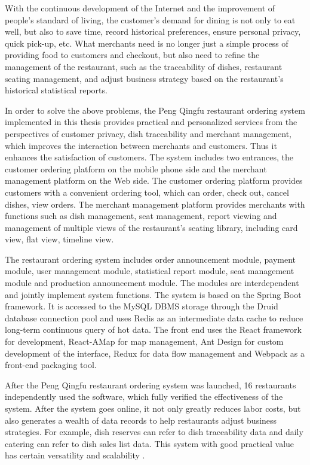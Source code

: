 \documentclass[oneside, master, UTF8]{NJUthesis}
\theoremstyle{plain}
\begin{document}
\begin{englishabstract}

With the continuous development of the Internet and the improvement of people's standard of living, the customer's demand for dining is not only to eat well, but also to save time, record historical preferences, ensure personal privacy, quick pick-up, etc.
What merchants need is no longer just a simple process of providing food to customers and checkout, but also need to refine the management of the restaurant, such as the traceability of dishes, restaurant seating management, and adjust business strategy based on the restaurant's historical statistical reports.

In order to solve the above problems, the Peng Qingfu restaurant ordering system implemented in this thesis provides practical and personalized services from the perspectives of customer privacy, dish traceability and merchant management, which improves the interaction between merchants and customers. Thus it enhances the satisfaction of customers. The system includes two entrances, the customer ordering platform on the mobile phone side and the merchant management platform on the Web side. 
The customer ordering platform provides customers with a convenient ordering tool, which can order, check out, cancel dishes, view orders.
The merchant management platform provides merchants with functions such as dish  management, seat management, report viewing and management of multiple views of the restaurant's seating library, including card view, flat view, timeline view.

The restaurant ordering system includes order announcement module, payment module, user management module, statistical report module, seat management module and production announcement module. The modules are interdependent and jointly implement system functions.
The system is based on the Spring Boot framework. It is accessed to the MySQL DBMS storage through the Druid database connection pool and uses Redis as an intermediate data cache to reduce long-term continuous query of hot data.
The front end uses the React framework for development, React-AMap for map management, Ant Design for custom development of the interface, Redux for data flow management and Webpack as a front-end packaging tool.

After the Peng Qingfu restaurant ordering system was launched, 16 restaurants independently used the software, which fully verified the effectiveness of the system. 
After the system goes online, it not only greatly reduces labor costs, but also generates a wealth of data records to help restaurants adjust business strategies. 
For example, dish reserves can refer to dish traceability data and daily catering can refer to dish sales list data. This system with good practical value has certain versatility and scalability .
  

\end{englishabstract}
\end{document}
